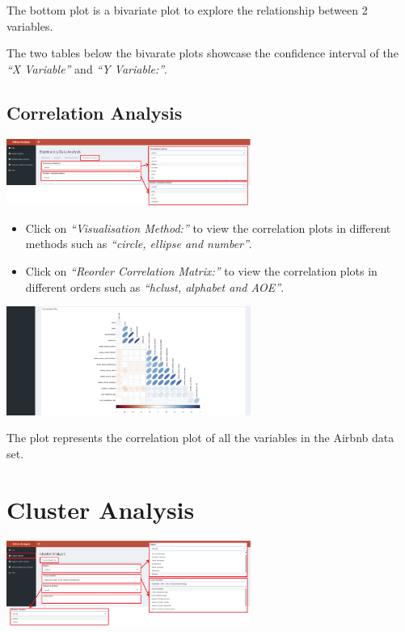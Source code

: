 \documentclass[
]{article}
\providecommand{\tightlist}{%
  \setlength{\itemsep}{0pt}\setlength{\parskip}{0pt}}
\begin{document}
The bottom plot is a bivariate plot to explore the relationship between
2 variables.

The two tables below the bivarate plots showcase the confidence interval
of the \emph{``X Variable''} and \emph{``Y Variable:''}.

\hypertarget{correlation-analysis}{%
\subsection{Correlation Analysis}\label{correlation-analysis}}

\includegraphics[width=0.6\textwidth,height=\textheight]{images/edacorr.png}

\begin{itemize}
\tightlist
\item
  Click on \emph{``Visualisation Method:''} to view the correlation
  plots in different methods such as \emph{``circle, ellipse and
  number''}.
\item
  Click on \emph{``Reorder Correlation Matrix:''} to view the
  correlation plots in different orders such as \emph{``hclust, alphabet
  and AOE''}.
\end{itemize}

\includegraphics[width=0.6\textwidth,height=\textheight]{images/edacorr2.png}

The plot represents the correlation plot of all the variables in the
Airbnb data set.

\hypertarget{cluster-analysis}{%
\section{Cluster Analysis}\label{cluster-analysis}}

\includegraphics[width=0.6\textwidth,height=\textheight]{images/cluster.png}
\end{document}
